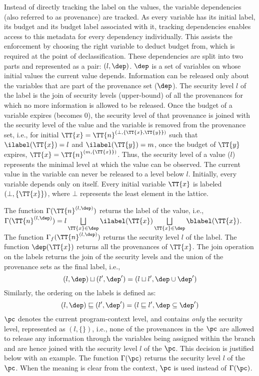 Instead of directly tracking the label on the values, the variable
dependencies (also referred to as provenance) are tracked.
As every variable has its initial label, its budget and its budget
label associated with it, tracking dependencies enables access to 
this metadata for every dependency individually. This assists the
enforcement by choosing the right variable to deduct budget from, 
which is required at the point of declassification. These dependencies
are split into two parts and represented as a pair: $(l, \dep)$. 
$\dep$ is a set of variables on whose initial values the current
value depends. Information can be released only about the variables
that are part of the provenance set ($\dep$). The security level $l$
of the label is the join of security levels (upper-bound) of all the
provenances for which no more information is allowed to be
released. Once the budget of a variable expires (becomes $0$), the
security level of that provenance is joined with the security level of
the value and the variable is removed from the provenance set, i.e.,
for initial $\TT{x} = \TT{n}^{(\bot, \{\TT{x}, \TT{y}\})}$ such that
$\ilabel(\TT{x}) = l$ and $\ilabel(\TT{y}) = m$, once the budget of
$\TT{y}$ expires, $\TT{x} = \TT{n}^{(m, \{\TT{x}\})}$.  Thus, the
security level of a value ($l$) represents the minimal level at which
the value can be observed. The current value in the variable can never
be released to a level below $l$. Initially, every variable depends
only on itself. Every initial variable $\TT{x}$ is labeled $(\bot,
\{\TT{x}\})$, where $\bot$ represents the least element in the lattice. 

The function $\Gamma(\TT{n}^{(l, \dep)})$ returns the label of the
value, i.e., $\Gamma(\TT{n}^{(l, \dep)}) = l \bigsqcup\limits_{\TT{x}
  \in \dep} \ilabel(\TT{x}) \bigsqcup\limits_{\TT{x} \in \dep}
\blabel(\TT{x})$.  The function $\Gamma_f(\TT{n}^{(l, \dep)})$ returns
the security level $l$ of the label.  The function $\dep(\TT{x})$
returns all the provenances of $\TT{x}$. 
The join operation on the labels returns the join of the security levels and the
union of the provenance sets as the final label, i.e.,
$$(l, \dep) \sqcup (l', \dep') = (l \sqcup l', \dep \cup \dep')$$
Similarly, the ordering on the labels is defined as:
$$(l, \dep) \sqsubseteq (l', \dep') = (l \sqsubseteq l', \dep \subseteq \dep')$$
$\pc$ denotes the current program-context level, and %
contains \emph{only} the security level, represented as $(l, \{\})$,
i.e., none of the provenances in the $\pc$ are allowed to release any
information through the variables being assigned within the branch and
are hence joined with the security level $l$ of the $\pc$.  This
decision is justified below with an example. The function
$\Gamma(\pc)$ returns the security level $l$ of the 
$\pc$. When the meaning is clear from the context, $\pc$ is used
instead of $\Gamma(\pc)$.  

